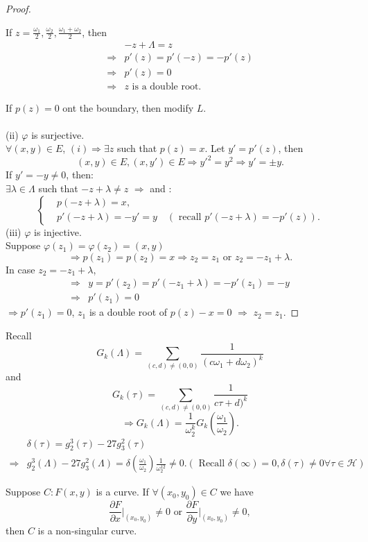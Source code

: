 \begin{proof}
\begin{remark}
  If $z= \frac{\omega_1}{2},\frac{\omega_2}{2},\frac{\omega_1+\omega_2}{2}$, then
  \begin{align*}
    &-z+\Lambda=z\\
    \Rightarrow& p'(z)=p'(-z)=-p'(z)\\
    \Rightarrow& p'(z)=0\\
    \Rightarrow & z  \text{ is a double root}
  .\end{align*} 
\end{remark}
If $p(z)=0$ ont the boundary, then modify $L$.\\
\\
(ii) $\varphi$ is surjective.\\
$\forall (x,y)\in E$, $(i)\Rightarrow \exists z$ such that $p(z)=x$. Let $y'=p'(z)$, then
 \[
   (x,y) \in E,(x,y')\in E\Rightarrow y'^2=y^2\Rightarrow y'=\pm y.
\] 
If $y'=-y\neq 0$, then:\\
$\exists \lambda \in \Lambda$ such that $-z+\lambda\neq z $ $\Rightarrow$ and :
\[
\left\{\begin{aligned}
   & p(-z+\lambda)=x,\\
   & p'(-z+\lambda)=-y'=y\quad (\text{ recall }p'(-z+ \lambda )=-p'(z)).
\end{aligned}\right.
\]
(iii) $\varphi$ is injective. \\
Suppose $\varphi(z_1)=\varphi(z_2)=(x,y)$ 
 \[
   \Rightarrow p(z_1)=p(z_2)=x\Rightarrow z_2=z_1 \text{ or } z_2=-z_1+\lambda.
\] 
In case $z_2=-z_1+\lambda$,
\begin{align*}
  \Rightarrow & y=p'(z_2)=p'(-z_1+\lambda)=-p'(z_1)=-y\\
  \Rightarrow & p'(z_1)=0
\end{align*}
$\Rightarrow p'(z_1)=0$, $z_1$ is a double root of $p(z)-x=0$ $\Rightarrow$ $z_2=z_1$.
\end{proof}
Recall 
\[
  G_k(\Lambda)=\sum_{(c,d)\neq(0,0)} \frac{1}{(c\omega_1+d\omega_2)^{k}}
\] 
and 
\[
  G_k(\tau)= \sum_{(c,d)\neq (0,0)}\frac{1}{c\tau+d)^{k}}
\] 
\[
  \Rightarrow G_k(\Lambda)=\frac{1}{\omega_2^{k}}G_k\left( \frac{\omega_1}{\omega_2} \right). 
\] 
\begin{align*}
 & \delta(\tau)=g_2^3(\tau)-27g_3^2(\tau)\\
  \Rightarrow & g_2^3(\Lambda)-27g_3^2(\Lambda)=\delta \left( \frac{\omega_1}{\omega_2} \right) \frac{1}{\omega_2^{12}} \neq 0. \left( \text{ Recall } \delta(\infty)=0, \delta(\tau)\neq 0 \forall\tau \in \mathcal{H} \right) 
\end{align*}
\begin{definition}
Suppose $C:F(x,y)$ is a curve. If $\forall (x_0,y_0)\in C$ we have
\[
  \frac{\partial F}{\partial x} \lvert_{(x_0,y_0)}\neq 0 \text{ or } \frac{\partial F}{\partial y} \lvert_{(x_0,y_0)}\neq 0,
\] 
then $C$ is a non-singular curve.
\end{definition}


